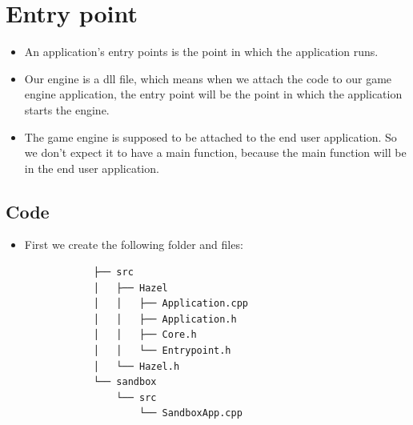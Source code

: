 
\section{Entry point}
\begin{itemize}
    \item An application's entry points is the point in which the application runs.
    \item Our engine is a dll file, which means when we attach the code to our game engine application, the entry point will be the point in which the application starts the engine.
    \item The game engine is supposed to be attached to the end user application. So we don't expect it to have a main function, because the main function will be in the end user application.
\end{itemize}

\subsection{Code}
\begin{itemize}
    \item First we create the following folder and files:
        \begin{verbatim}
            ├── src
            │   ├── Hazel
            │   │   ├── Application.cpp
            │   │   ├── Application.h
            │   │   ├── Core.h
            │   │   └── Entrypoint.h
            │   └── Hazel.h
            └── sandbox
                └── src
                    └── SandboxApp.cpp
        \end{verbatim}
\end{itemize}


